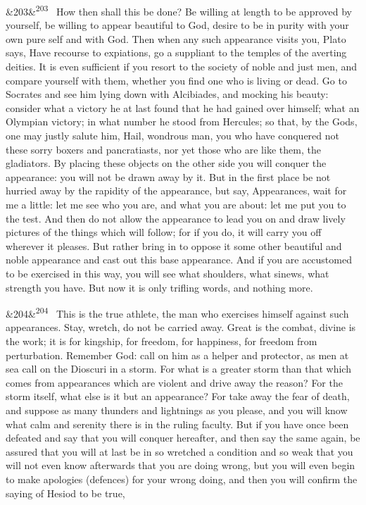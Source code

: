\documentclass[12pt]{article}
\newcommand{\para}[1][]{\par\noindent\ifx&#1&\else\textsuperscript{\footnotesize #1}~\fi}
\begin{document}
\para[203] How then shall this be done? Be willing at length to be approved by yourself, be willing to appear beautiful to God, desire to be in purity with your own pure self and with God. Then when any such appearance visits you, Plato says, Have recourse to expiations, go a suppliant to the temples of the averting deities. It is even sufficient if you resort to the society of noble and just men, and compare yourself with them, whether you find one who is living or dead. Go to Socrates and see him lying down with Alcibiades, and mocking his beauty: consider what a victory he at last found that he had gained over himself; what an Olympian victory; in what number he stood from Hercules; so that, by the Gods, one may justly salute him, Hail, wondrous man, you who have conquered not these sorry boxers and pancratiasts, nor yet those who are like them, the gladiators. By placing these objects on the other side you will conquer the appearance: you will not be drawn away by it. But in the first place be not hurried away by the rapidity of the appearance, but say, Appearances, wait for me a little: let me see who you are, and what you are about: let me put you to the test. And then do not allow the appearance to lead you on and draw lively pictures of the things which will follow; for if you do, it will carry you off wherever it pleases. But rather bring in to oppose it some other beautiful and noble appearance and cast out this base appearance. And if you are accustomed to be exercised in this way, you will see what shoulders, what sinews, what strength you have. But now it is only trifling words, and nothing more.

\para[204] This is the true athlete, the man who exercises himself against such appearances. Stay, wretch, do not be carried away. Great is the combat, divine is the work; it is for kingship, for freedom, for happiness, for freedom from perturbation. Remember God: call on him as a helper and protector, as men at sea call on the Dioscuri in a storm. For what is a greater storm than that which comes from appearances which are violent and drive away the reason? For the storm itself, what else is it but an appearance? For take away the fear of death, and suppose as many thunders and lightnings as you please, and you will know what calm and serenity there is in the ruling faculty. But if you have once been defeated and say that you will conquer hereafter, and then say the same again, be assured that you will at last be in so wretched a condition and so weak that you will not even know afterwards that you are doing wrong, but you will even begin to make apologies (defences) for your wrong doing, and then you will confirm the saying of Hesiod to be true,
\end{document}
